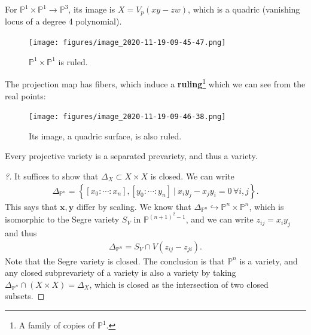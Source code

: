 \begin{example}[?]

For \({\mathbb{P}}^1 \times{\mathbb{P}}^1 \to {\mathbb{P}}^3\), its
image is \(X = V_p(xy - zw)\), which is a quadric (vanishing locus of a
degree 4 polynomial).

\begin{figure}
\centering
\texttt{[image: figures/image\_2020-11-19-09-45-47.png]}
\caption{\({\mathbb{P}}^1 \times{\mathbb{P}}^1\) is ruled.}
\end{figure}

The projection map has fibers, which induce a \textbf{ruling}\footnote{A
  family of copies of \({\mathbb{P}}^1\).} which we can see from the
real points:

\begin{figure}
\centering
\texttt{[image: figures/image\_2020-11-19-09-46-38.png]}
\caption{Its image, a quadric surface, is also ruled.}
\end{figure}

\end{example}

\begin{corollary}[?]

Every projective variety is a separated prevariety, and thus a variety.

\end{corollary}

\begin{proof}[?]

It suffices to show that \(\Delta_X \subset X\times X\) is closed. We
can write
\begin{align*}  
\Delta_{{\mathbb{P}}^n} = 
\left\{{
[x_0: \cdots: x_n], [y_0: \cdots : y_n] {~\mathrel{\Big|}~}
x_i y_j - x_j y_i = 0 \, \forall i, j
}\right\}
.\end{align*}
This says that \(\mathbf{x}, \mathbf{y}\) differ by scaling. We know
that
\(\Delta_{{\mathbb{P}}^n} \hookrightarrow{\mathbb{P}}^n \times{\mathbb{P}}^n\),
which is isomorphic to the Segre variety \(S_V\) in
\({\mathbb{P}}^{(n+1)^2 -1}\), and we can write \(z_{ij} = x_i y_j\) and
thus
\begin{align*}  
\Delta_{{\mathbb{P}}^n} = S_V \cap V(z_{ij} - z_{ji})
.\end{align*}
Note that the Segre variety is closed. The conclusion is that
\({\mathbb{P}}^n\) is a variety, and any closed subprevariety of a
variety is also a variety by taking
\(\Delta_{{\mathbb{P}}^n} \cap(X\times X) = \Delta_X\), which is closed
as the intersection of two closed subsets.

\end{proof}

